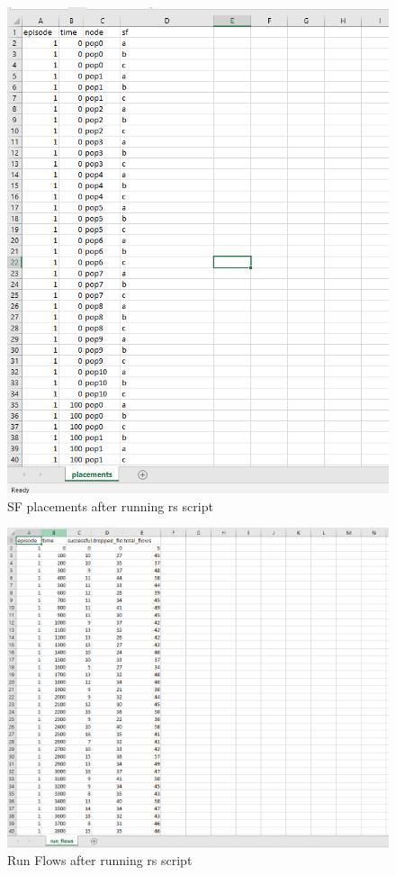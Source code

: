 \begin{figure}[h]
    \centering
    \includegraphics[width=1\textwidth]{rsplacements}
    \caption{SF placements after running rs script}
    \label{fig:rsplacements}
\end{figure}


\begin{figure}[h]
    \centering
    \includegraphics[width=1\textwidth]{rsrunflows}
    \caption{Run Flows after running rs script}
    \label{fig:rsrunflows}
\end{figure}